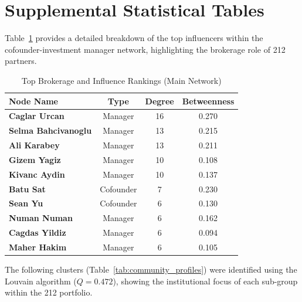 \documentclass[conference]{IEEEtran}
\begin{document}
\section{Supplemental Statistical Tables}

Table~\ref{tab:centrality_rankings} provides a detailed breakdown of the top influencers within the cofounder-investment manager network, highlighting the brokerage role of 212 partners.

\begin{table}[htbp]
\caption{Top Brokerage and Influence Rankings (Main Network)}
\label{tab:centrality_rankings}
\begin{center}
\begin{tabular}{|l|c|c|c|}
\hline
\textbf{Node Name} & \textbf{Type} & \textbf{Degree} & \textbf{Betweenness} \\
\hline
\textbf{Caglar Urcan} & Manager & 16 & 0.270 \\
\textbf{Selma Bahcivanoglu} & Manager & 13 & 0.215 \\
\textbf{Ali Karabey} & Manager & 13 & 0.211 \\
\textbf{Gizem Yagiz} & Manager & 10 & 0.108 \\
\textbf{Kivanc Aydin} & Manager & 10 & 0.137 \\
\textbf{Batu Sat} & Cofounder & 7 & 0.230 \\
\textbf{Sean Yu} & Cofounder & 6 & 0.130 \\
\textbf{Numan Numan} & Manager & 6 & 0.162 \\
\textbf{Cagdas Yildiz} & Manager & 6 & 0.094 \\
\textbf{Maher Hakim} & Manager & 6 & 0.105 \\
\hline
\end{tabular}
\end{center}
\end{table}

The following clusters (Table~\ref{tab:community_profiles}) were identified using the Louvain algorithm ($Q=0.472$), showing the institutional focus of each sub-group within the 212 portfolio.
\end{document}

